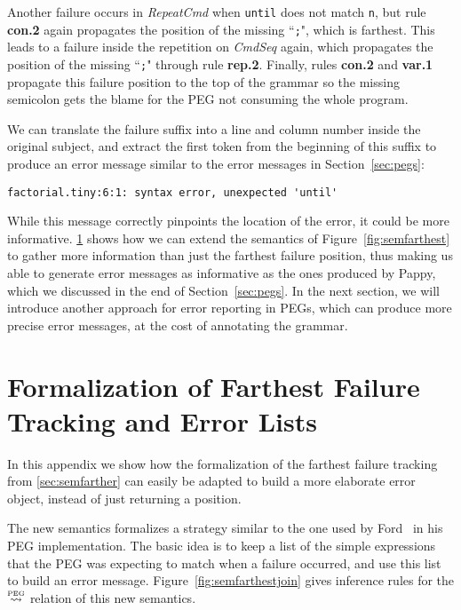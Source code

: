 \documentclass[3p,12pt,singlecolumn]{elsarticle}
\newcommand{\Lp}{\stackrel{\mbox{\tiny{PEG}}}{\leadsto}}
\begin{document}
Another failure occurs in {\it RepeatCmd} when {\tt until}
does not match {\tt n}, but rule {\bf con.2} again propagates
the position of the missing ``{\tt ;}", which is farthest.
This leads to a failure inside the repetition on {\it CmdSeq}
again, which propagates the position of the missing ``{\tt ;}"
through rule {\bf rep.2}. Finally, rules {\bf con.2} and {\bf var.1}
propagate this failure position to the top of the grammar
so the missing semicolon gets the blame for the PEG
not consuming the whole program.

We can translate the failure suffix into a line and column
number inside the original subject, and extract the
first token from the beginning of this suffix to
produce an error message similar to the error messages
in Section~\ref{sec:pegs}:

\begin{verbatim}
factorial.tiny:6:1: syntax error, unexpected 'until'
\end{verbatim}

While this message correctly pinpoints the location
of the error, it could be more informative.
\ref{sec:fartherandlist} shows how we can
extend the semantics of Figure~\ref{fig:semfarthest}
to gather more information than just the farthest
failure position, thus making us able to generate
error messages as informative as the ones produced by Pappy,
which we discussed in the end of Section~\ref{sec:pegs}.
In the next section, we will introduce another approach
for error reporting in PEGs, which can produce more precise
error messages, at the cost of annotating the grammar.

\section{Formalization of Farthest Failure Tracking and Error Lists}
\label{sec:fartherandlist}

In this appendix we show how the formalization of the farthest failure tracking
from \ref{sec:semfarther} can easily be adapted
to build a more elaborate error object, instead of just returning a position.

The new semantics formalizes a strategy similar to
the one used by Ford~\citep{ford2002packrat} in his
PEG implementation. The basic idea is to keep a list of
the simple expressions that the PEG was expecting to match when
a failure occurred, and use this list to build
an error message. Figure~\ref{fig:semfarthestjoin}
gives inference rules for the $\Lp$ relation of
this new semantics.
\end{document}
